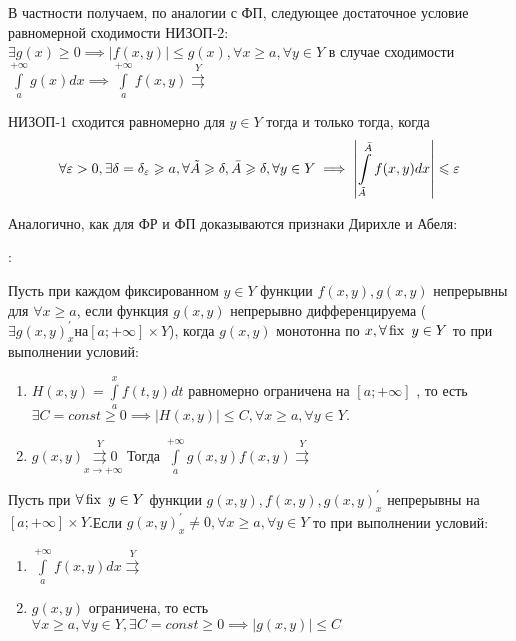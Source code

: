 \documentclass[../../main.tex]{subfiles}
\begin{document}
В частности получаем, по аналогии с ФП, следующее достаточное условие 
равномерной сходимости НИЗОП-2:
$\exists g(x) \ge 0 \implies \left| f(x,y) \right| \le g(x), \forall x \ge a, 
\forall y \in Y $ в случае сходимости $\int\limits_a^{+\infty}g(x)dx \implies 
\int\limits_a^{+\infty}f(x,y) \overset{Y}\rightrightarrows $

\begin{crl*}
НИЗОП-1 сходится равномерно для $ y \in Y$ тогда и только тогда, 
когда\begin{equation}\label{lec10:11} \forall \varepsilon > 0, \exists \delta = 
\delta_\varepsilon \geqslant a, \forall \tilde{A} \geqslant \delta, \bar{A} \geqslant \delta, \forall y 
\in Y \implies \left| \int\limits_{\tilde{A}}^{\bar{A}}f(x,y)dx \right| \leqslant 
\varepsilon \end{equation}
\end{crl*}

Аналогично, как для ФР и ФП доказываются признаки Дирихле и Абеля:

\begin{thm}
:

Пусть при каждом фиксированном $y \in Y$ функции $f(x,y),g(x,y)$ непрерывны 
для $\forall x \ge a$, если функция $g(x,y)$ непрерывно дифференцируема 
($\exists g(x,y)_x^\prime на [a;+\infty] \times Y $), когда $g(x,y)$ 
монотонна по $x, \forall \operatorname{fix} \ y \in Y$ то при выполнении условий:

\begin{enumerate}
\item $H(x,y) = \int\limits_a^x f(t,y)dt$ равномерно ограничена на 
$[a;+\infty]$ 
, то  есть $\exists C = const \ge 0 \implies \left|H(x,y)\right| \le C, 
\forall x \ge a, \forall y \in Y.$
\item $g(x,y)\underset{x \to +\infty}{\overset{Y}{\rightrightarrows} 0}$
Тогда $\int\limits_a^{+\infty} g(x,y)f(x,y) \overset{Y}{\rightrightarrows}$
\end{enumerate}
\end{thm}

\begin{thm}

Пусть при $\forall \operatorname{fix} \ y \in Y $ функции $g(x,y), f(x,y), g(x,y)_x^\prime$ 
непрерывны на $[a;+\infty]\times Y.$Если $ g(x,y)_x^\prime \not = 0, \forall x 
\ge a, \forall y \in Y $ то при выполнении условий:

\begin{enumerate}
\item $\int\limits_a^{+\infty}f(x,y)dx \overset{Y}{\rightrightarrows}$

\item $g(x,y)$ ограничена, то есть $\forall x \ge a, \forall y \in Y, \exists 
C = 
const \ge 0 \implies \left|g(x,y)\right| \le C $
\end{enumerate}
\end{thm}
\end{document}
